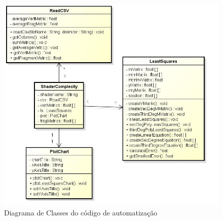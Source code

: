 	\begin{figure}[ht]
	\centering
		\includegraphics[keepaspectratio=true,scale=0.6]{figuras/minquad_diag.jpg}
	\caption{Diagrama de Classes do código de automatização}
	\label{minquad_diag}
	\end{figure}

